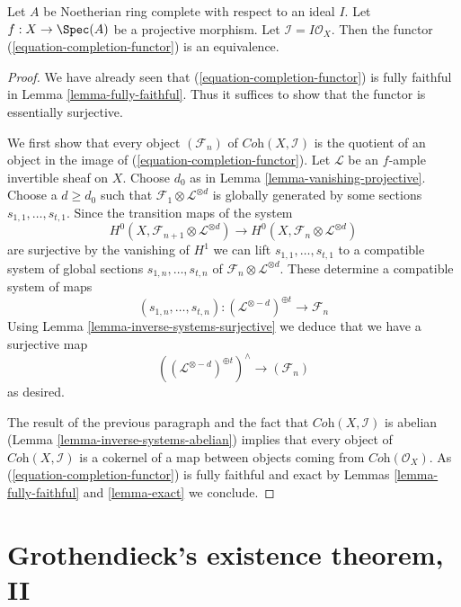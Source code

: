 \begin{lemma}
\label{lemma-existence-projective}
Let $A$ be Noetherian ring complete with respect to an ideal $I$.
Let $f : X \to \Spec(A)$ be a projective morphism. Let
$\mathcal{I} = I\mathcal{O}_X$.
Then the functor (\ref{equation-completion-functor}) is an equivalence.
\end{lemma}

\begin{proof}
We have already seen that (\ref{equation-completion-functor}) is
fully faithful in Lemma \ref{lemma-fully-faithful}. Thus it suffices
to show that the functor is essentially surjective.

\medskip\noindent
We first show that every object $(\mathcal{F}_n)$ of
$\textit{Coh}(X, \mathcal{I})$ is the quotient of an object
in the image of (\ref{equation-completion-functor}). 
Let $\mathcal{L}$ be an $f$-ample invertible sheaf on $X$.
Choose $d_0$ as in Lemma \ref{lemma-vanishing-projective}.
Choose a $d \geq d_0$ such that
$\mathcal{F}_1 \otimes \mathcal{L}^{\otimes d}$
is globally generated by some sections $s_{1, 1}, \ldots, s_{t, 1}$.
Since the transition maps of the system
$$
H^0(X, \mathcal{F}_{n + 1} \otimes \mathcal{L}^{\otimes d})
\longrightarrow
H^0(X, \mathcal{F}_n \otimes \mathcal{L}^{\otimes d})
$$
are surjective by the vanishing of $H^1$ we can lift
$s_{1, 1}, \ldots, s_{t, 1}$ to a compatible system of global sections
$s_{1, n}, \ldots, s_{t, n}$ of
$\mathcal{F}_n \otimes \mathcal{L}^{\otimes d}$.
These determine a compatible system of maps
$$
(s_{1, n}, \ldots, s_{t, n}) :
(\mathcal{L}^{\otimes -d})^{\oplus t} \longrightarrow \mathcal{F}_n
$$
Using Lemma \ref{lemma-inverse-systems-surjective}
we deduce that we have a surjective map
$$
\left((\mathcal{L}^{\otimes -d})^{\oplus t}\right)^\wedge
\longrightarrow
(\mathcal{F}_n)
$$
as desired.

\medskip\noindent
The result of the previous paragraph and the fact that
$\textit{Coh}(X, \mathcal{I})$ is abelian
(Lemma \ref{lemma-inverse-systems-abelian})
implies that
every object of $\textit{Coh}(X, \mathcal{I})$ is a cokernel
of a map between objects coming from $\textit{Coh}(\mathcal{O}_X)$.
As (\ref{equation-completion-functor}) is fully faithful and exact by
Lemmas \ref{lemma-fully-faithful} and \ref{lemma-exact}
we conclude.
\end{proof}








\section{Grothendieck's existence theorem, II}
\label{section-existence-proper}

